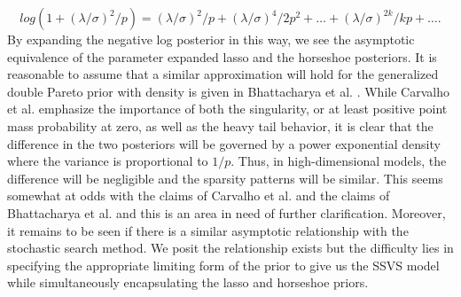 \begin{equation}\label{eqn:taylor_log_one_plus_x}
log\left(1+(\lambda/\sigma)^2/p\right) = (\lambda/\sigma)^2/p + (\lambda/\sigma)^4/2p^2 + \dots+ (\lambda/\sigma)^{2k}/kp + \dots.
\end{equation}
By expanding the negative log posterior in this way, we see the asymptotic equivalence of the parameter expanded lasso and the horseshoe posteriors. It is reasonable to assume that a similar approximation will hold for the generalized double Pareto prior with density is given in Bhattacharya et al. \cite{bhattacharya2012bayesian}. While Carvalho et al. \cite{carvalho2010horseshoe} emphasize the importance of both the singularity, or at least positive point mass probability at zero, as well as the heavy tail behavior, it is clear that the difference in the two posteriors will be governed by a power exponential density where the variance is proportional to $1/p$. Thus, in high-dimensional models, the difference will be negligible and the sparsity patterns will be similar. This seems somewhat at odds with the claims of Carvalho et al. and the claims of Bhattacharya et al. and this is an area in need of further clarification. Moreover, it remains to be seen if there is a similar asymptotic relationship with the stochastic search method. We posit the relationship exists but the difficulty lies in specifying the appropriate limiting form of the prior to give us the SSVS model while simultaneously encapsulating the lasso and horseshoe priors. 



 